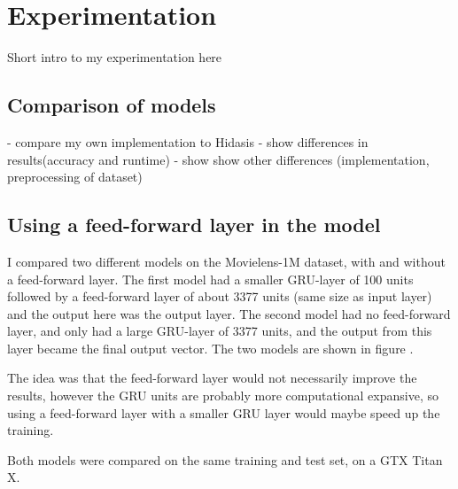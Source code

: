 \chapter{Experimentation}
Short intro to my experimentation here

\section{Comparison of models}
- compare my own implementation to Hidasis
  - show differences in results(accuracy and runtime)
  - show show other differences (implementation, preprocessing of dataset)

\section{Using a feed-forward layer in the model}
I compared two different models on the Movielens-1M dataset, with and without a feed-forward layer. The first model had a smaller GRU-layer of 100 units followed by a feed-forward layer of about 3377 units (same size as input layer) and the output here was the output layer. The second model had no feed-forward layer, and only had a large GRU-layer of 3377 units, and the output from this layer became the final output vector. The two models are shown in figure . 

The idea was that the feed-forward layer would not necessarily improve the results, however the GRU units are probably more computational expansive, so using a feed-forward layer with a smaller GRU layer would maybe speed up the training.

Both models were compared on the same training and test set, on a GTX Titan X.

